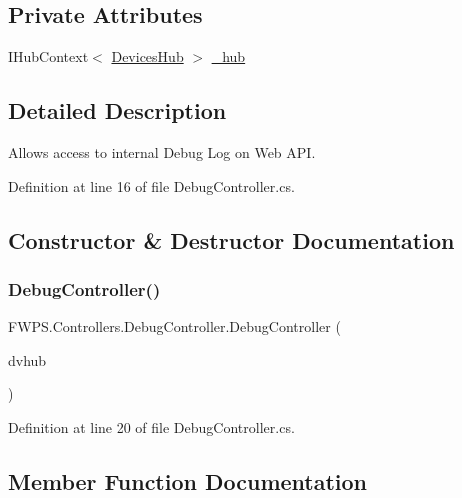 \subsection*{Private Attributes}
\begin{DoxyCompactItemize}
\item 
I\+Hub\+Context$<$ \mbox{\hyperlink{class_f_w_p_s_1_1_devices_hub}{Devices\+Hub}} $>$ \mbox{\hyperlink{class_f_w_p_s_1_1_controllers_1_1_debug_controller_afba643967a93142414405a1eeb093877}{\+\_\+hub}}
\end{DoxyCompactItemize}


\subsection{Detailed Description}
Allows access to internal Debug Log on Web A\+PI. 

Definition at line 16 of file Debug\+Controller.\+cs.



\subsection{Constructor \& Destructor Documentation}
\mbox{\label{class_f_w_p_s_1_1_controllers_1_1_debug_controller_a170ad002d9604b8b7288780876cdd749}} 
\subsubsection{\texorpdfstring{Debug\+Controller()}{DebugController()}}
{\footnotesize\ttfamily F\+W\+P\+S.\+Controllers.\+Debug\+Controller.\+Debug\+Controller (\begin{DoxyParamCaption}\item[{I\+Hub\+Context$<$ \mbox{\hyperlink{class_f_w_p_s_1_1_devices_hub}{Devices\+Hub}} $>$}]{dvhub }\end{DoxyParamCaption})}



Definition at line 20 of file Debug\+Controller.\+cs.



\subsection{Member Function Documentation}
\mbox{\label{class_f_w_p_s_1_1_controllers_1_1_debug_controller_a6b023fe7e63e0cdd665c151bed5e5ed1}} 
